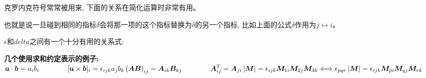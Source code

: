 克罗内克符号常常被用来, 下面的关系在简化运算时非常有用。
\begin{lequation}
\end{lequation}

也就是说一旦碰到相同的指标$\delta$会将那一项的这个指标替换为$\delta$的另一个指标, 比如上面的公式$\delta$作用为$j\leftrightarrow i$。

$\epsilon$和$delta$之间有一个十分有用的关系式:
\begin{lequation}
\end{lequation}
\begin{thinknote}
    \textbf{几个使用求和约定表示的例子:}\\
    \begin{math}
        \displaystyle
        \bm{a}\cdot\bm{b}=a_ib_i \qquad\qquad [\bm{a}\times\bm{b}]_i=\epsilon_{ijk}a_jb_k\\
        \left(\bm{A}\bm{B}\right)_{ij}=\bm{A}_{ik}\bm{B}_{kj} \qquad\qquad \bm{A}^{T}_{ij}=\bm{A}_{ji}\\
        \left|\bm{M}\right| =\epsilon_{ijk}\bm{M}_{1i}\bm{M}_{2j}\bm{M}_{3k}\Longleftrightarrow \epsilon_{pqr}\left|\bm{M}\right|=\epsilon_{ijk}\bm{M}_{pi}\bm{M}_{qj}\bm{M}_{rk}
    \end{math}
\end{thinknote}
